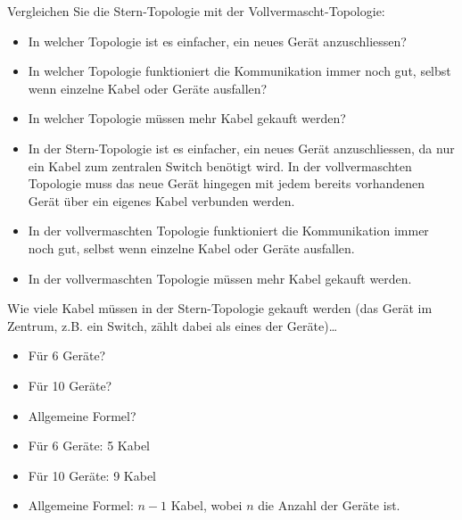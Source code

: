 \begin{myexercise}
	Vergleichen Sie die Stern-Topologie mit der Vollvermascht-Topologie:
	\begin{itemize}
		\item In welcher Topologie ist es einfacher, ein neues Gerät anzuschliessen?
		\item In welcher Topologie funktioniert die Kommunikation immer noch gut, selbst wenn einzelne Kabel oder Geräte ausfallen?
		\item In welcher Topologie müssen mehr Kabel gekauft werden?
	\end{itemize}
	\begin{myanswer}
		\begin{itemize}
			\item In der Stern-Topologie ist es einfacher, ein neues Gerät anzuschliessen, da nur ein Kabel zum zentralen Switch benötigt wird. In der vollvermaschten Topologie muss das neue Gerät hingegen mit jedem bereits vorhandenen Gerät über ein eigenes Kabel verbunden werden.
			\item In der vollvermaschten Topologie funktioniert die Kommunikation immer noch gut, selbst wenn einzelne Kabel oder Geräte ausfallen.
			\item In der vollvermaschten Topologie müssen mehr Kabel gekauft werden.
		\end{itemize}
	\end{myanswer}
\end{myexercise}

\begin{myexercise}
	Wie viele Kabel müssen in der Stern-Topologie gekauft werden (das Gerät im Zentrum, z.B. ein Switch, zählt dabei als eines der Geräte)\dots
	\begin{itemize}
		\item Für 6 Geräte?
		\item Für 10 Geräte?
		\item Allgemeine Formel?
	\end{itemize}
	\begin{myanswer}
		\begin{itemize}
			\item Für 6 Geräte: 5 Kabel
			\item Für 10 Geräte: 9 Kabel
			\item Allgemeine Formel: $n-1$ Kabel, wobei $n$ die Anzahl der Geräte ist.
		\end{itemize}
	\end{myanswer}
\end{myexercise}

